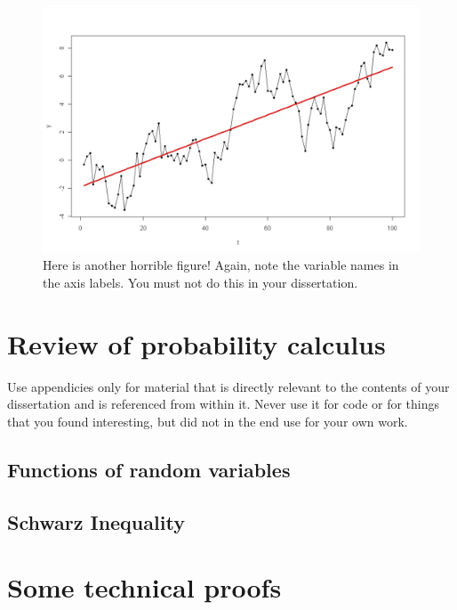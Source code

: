 \documentclass[
  12pt,
  a4paper,
  twoside]{book}
\begin{document}
\begin{figure}[H]

{\centering \includegraphics[width=0.8\linewidth]{figures/Rwalk} 

}

\caption{Here is another horrible figure! Again, note the variable names in the axis labels. You must not do this in your dissertation. }\label{fig:Rwalk}
\end{figure}

\hypertarget{appendix-appendix}{%
\appendix}


\hypertarget{review-of-probability-calculus}{%
\chapter{Review of probability calculus}\label{review-of-probability-calculus}}

Use appendicies only for material that is directly relevant to the contents of your dissertation and is referenced from within it. Never use it for code or for things that you found interesting, but did not in the end use for your own work.

\hypertarget{functions-of-random-variables}{%
\section{Functions of random variables}\label{functions-of-random-variables}}

\hypertarget{schwarz-inequality}{%
\section{Schwarz Inequality}\label{schwarz-inequality}}

\hypertarget{some-technical-proofs}{%
\chapter{Some technical proofs}\label{some-technical-proofs}}
\end{document}
